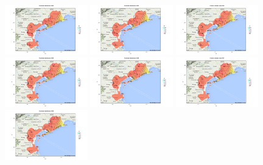 \documentclass[a4paper,11pt,twoside,openright]{book}							%
\begin{document}
\begin{figure}[H]
	\includegraphics[trim=0cm 0cm 4cm 0cm,clip=true,width=0.32\textwidth]{Immagini/venezia_senza_covariate/Maps2002.png}
	\includegraphics[trim=0cm 0cm 4cm 0cm,clip=true,width=0.32\textwidth]{Immagini/venezia_senza_covariate/Maps2003.png}
	\includegraphics[trim=0cm 0cm 4cm 0cm,clip=true,width=0.32\textwidth]{Immagini/venezia_senza_covariate/Maps2004.png}
	\includegraphics[trim=0cm 0cm 4cm 0cm,clip=true,width=0.32\textwidth]{Immagini/venezia_senza_covariate/Maps2005.png}
	\includegraphics[trim=0cm 0cm 4cm 0cm,clip=true,width=0.32\textwidth]{Immagini/venezia_senza_covariate/Maps2006.png}
	\includegraphics[trim=0cm 0cm 4cm 0cm,clip=true,width=0.32\textwidth]{Immagini/venezia_senza_covariate/Maps2007.png}
	\includegraphics[trim=0cm 0cm 4cm 0cm,clip=true,width=0.32\textwidth]{Immagini/venezia_senza_covariate/Maps2008.png}

\end{figure}
\end{document}
